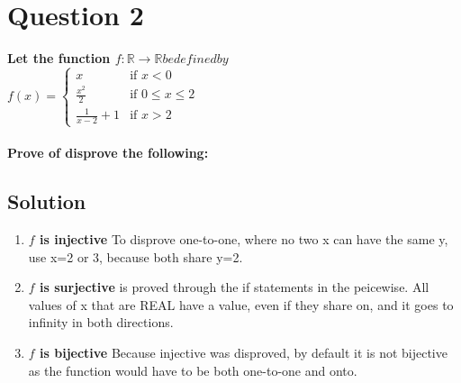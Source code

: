 \documentclass[11pt]{article}
\begin{document}
\clearpage
\section*{Question 2}
    \textbf{Let the function \(f: \mathbb{R} \rightarrow \mathbb{R} be defined by\) \\
    \(f(x) = \begin{cases}
        x & \text{if } x <0 \\
        \frac{x^2}{2} & \text{if } 0 \leq x \leq 2 \\
        \frac{1}{x-2}+1 & \text{if } x> 2
    \end{cases}\) \\ \\
    Prove of disprove the following:}
    \subsection*{Solution}
    \begin{enumerate}[label=(\alph*)]
        \item \textbf{\(f\) is injective} To disprove one-to-one, where no two x can have the same y, use x=2 or 3, because both share y=2.
        \item \textbf{\(f\) is surjective} is proved through the if statements in the peicewise. All values of x that are REAL have a value, even if they share on, and it goes to infinity in both directions.
        \item \textbf{\(f\) is bijective} Because injective was disproved, by default it is not bijective as the function would have to be both one-to-one and onto. 
    \end{enumerate}
\end{document}
